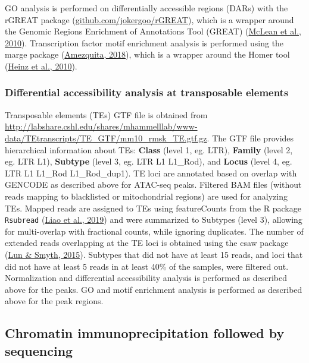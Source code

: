 \documentclass[12pt,twoside]{reedthesis}
\begin{document}
GO analysis is performed on differentially accessible regions (DARs)
with the rGREAT package
(\href{https://github.com/jokergoo/rGREAT}{github.com/jokergoo/rGREAT}),
which is a wrapper around the Genomic Regions Enrichment of Annotations
Tool (GREAT) (\protect\hyperlink{ref-mclean2010}{McLean et al., 2010}). Transcription factor motif enrichment
analysis is performed using the marge package (\protect\hyperlink{ref-amezquita2018}{Amezquita, 2018}), which is
a wrapper around the Homer tool (\protect\hyperlink{ref-heinz2010}{Heinz et al., 2010}).

\hypertarget{m3.3.4}{%
\subsubsection*{Differential accessibility analysis at transposable elements}\label{m3.3.4}}

Transposable elements (TEs) GTF file is obtained from
\href{http://labshare.cshl.edu/shares/mhammelllab/www-data/TEtranscripts/TE_GTF/mm10_rmsk_TE.gtf.gz\%20on\%2003.02.2020}{http://labshare.cshl.edu/shares/mhammelllab/www-data/TEtranscripts/TE\_GTF/mm10\_rmsk\_TE.gtf.gz}.
The GTF file provides hierarchical information about TEs: \textbf{Class}
(level 1, eg. LTR), \textbf{Family} (level 2, eg. LTR L1), \textbf{Subtype} (level
3, eg. LTR L1 L1\_Rod), and \textbf{Locus} (level 4, eg. LTR L1 L1\_Rod
L1\_Rod\_dup1). TE loci are annotated based on overlap with GENCODE as
described above for ATAC-seq peaks. Filtered BAM files (without reads
mapping to blacklisted or mitochondrial regions) are used for analyzing
TEs. Mapped reads are assigned to TEs using featureCounts from the R
package \texttt{Rsubread} (\protect\hyperlink{ref-liao2019}{Liao et al., 2019}) and were summarized to Subtypes (level
3), allowing for multi-overlap with fractional counts, while ignoring
duplicates. The number of extended reads overlapping at the TE loci is
obtained using the csaw package (\protect\hyperlink{ref-lun2015}{Lun \& Smyth, 2015}). Subtypes that did not have
at least 15 reads, and loci that did not have at least 5 reads in at
least 40\% of the samples, were filtered out. Normalization and
differential accessibility analysis is performed as described above for
the peaks. GO and motif enrichment analysis is performed as described
above for the peak regions.

\hypertarget{m3.4}{%
\subsection*{Chromatin immunoprecipitation followed by sequencing}\label{m3.4}}
\end{document}
